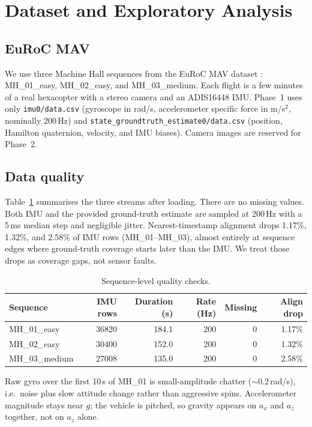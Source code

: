 
\section{Dataset and Exploratory Analysis}
\label{sec:dataset-eda}

\subsection{EuRoC MAV}
We use three Machine Hall sequences from the EuRoC MAV dataset
\cite{burri2016euroc}: MH\_01\_easy, MH\_02\_easy, and MH\_03\_medium.
Each flight is a few minutes of a real hexacopter with a stereo camera and
an ADIS16448 IMU. Phase~1 uses only \texttt{imu0/data.csv} (gyroscope in
rad/s, accelerometer specific force in m/s$^2$, nominally 200\,Hz) and
\texttt{state\_groundtruth\_estimate0/data.csv} (position, Hamilton
quaternion, velocity, and IMU biases). Camera images are reserved for
Phase~2.

\subsection{Data quality}
Table~\ref{tab:quality} summarises the three streams after loading.
There are no missing values. Both IMU and the provided ground-truth
estimate are sampled at 200\,Hz with a 5\,ms median step and negligible
jitter. Nearest-timestamp alignment drops 1.17\%, 1.32\%, and 2.58\% of
IMU rows (MH\_01--MH\_03), almost entirely at sequence edges where
ground-truth coverage starts later than the IMU. We treat those drops as
coverage gaps, not sensor faults.

\begin{table}[t]
\centering
\caption{Sequence-level quality checks.}
\label{tab:quality}
\begin{tabular}{lrrrrr}
\hline
Sequence & IMU rows & Duration (s) & Rate (Hz) & Missing & Align drop \\
\hline
MH\_01\_easy & 36820 & 184.1 & 200 & 0 & 1.17\% \\
MH\_02\_easy & 30400 & 152.0 & 200 & 0 & 1.32\% \\
MH\_03\_medium & 27008 & 135.0 & 200 & 0 & 2.58\% \\
\hline
\end{tabular}
\end{table}

Raw gyro over the first 10\,s of MH\_01 is small-amplitude chatter
($\sim$0.2\,rad/s), i.e.\ noise plus slow attitude change rather than
aggressive spins. Accelerometer magnitude stays near $g$; the vehicle is
pitched, so gravity appears on $a_x$ and $a_z$ together, not on $a_z$
alone.

